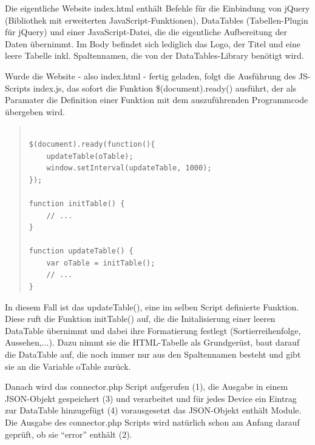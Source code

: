 \documentclass[a4paper,14pt,headsepline]{scrartcl}
\begin{document}
\newpage

Die eigentliche Website index.html enthält Befehle für die Einbindung von jQuery (Bibliothek mit erweiterten JavaScript-Funktionen), DataTables (Tabellen-Plugin für jQuery) und einer JavaScript-Datei, die die eigentliche Aufbereitung der Daten übernimmt. Im Body befindet sich lediglich das Logo, der Titel und eine leere Tabelle inkl. Spaltennamen, die von der DataTables-Library benötigt wird.  
 
Wurde die Website - also index.html - fertig geladen, folgt die Ausführung des JS-Scripts index.js, das sofort die Funktion \$(document).ready() ausführt, der als Paramater die Definition einer Funktion mit dem auszuführenden Programmcode übergeben wird. 

\begin{quote}
\begin{verbatim}

$(document).ready(function(){ 
    updateTable(oTable);
    window.setInterval(updateTable, 1000);
}); 

function initTable() {
    // ...
}
 
function updateTable() {
    var oTable = initTable();
    // ...
}

\end{verbatim}
\end{quote} 

\newpage

In diesem Fall ist das updateTable(), eine im selben Script definierte Funktion. Diese ruft die Funktion initTable() auf, die die Initalisierung einer leeren DataTable übernimmt und dabei ihre Formatierung festlegt (Sortierreihenfolge, Aussehen,...). Dazu nimmt sie die HTML-Tabelle als Grundgerüst, baut darauf die DataTable auf, die noch immer nur aus den Spaltennamen besteht und gibt sie an die Variable oTable zurück. 

Danach wird das connector.php Script aufgerufen (1), die Ausgabe in einem JSON-Objekt gespeichert (3) und verarbeitet und für jedes Device ein Eintrag zur DataTable hinzugefügt (4) vorausgesetzt das JSON-Objekt enthält Module. Die Ausgabe des connector.php Scripts wird natürlich schon am Anfang darauf geprüft, ob sie ``error'' enthält (2).
\end{document}
